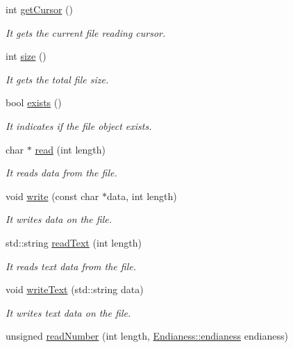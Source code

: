 \begin{DoxyCompactItemize}
int \hyperlink{class_file_a59701204411c5672fc35a95e31b002b3}{get\+Cursor} ()
\begin{DoxyCompactList}\small\item\em It gets the current file reading cursor. \end{DoxyCompactList}\item 
int \hyperlink{class_file_afcaf98328e440ccaedb20e310dc6b6c4}{size} ()
\begin{DoxyCompactList}\small\item\em It gets the total file size. \end{DoxyCompactList}\item 
bool \hyperlink{class_file_a4260fca380a387a8347b83bb4bee91b5}{exists} ()
\begin{DoxyCompactList}\small\item\em It indicates if the file object exists. \end{DoxyCompactList}\item 
char $\ast$ \hyperlink{class_file_a917f13960e83613e5cb36d433b4cd833}{read} (int length)
\begin{DoxyCompactList}\small\item\em It reads data from the file. \end{DoxyCompactList}\item 
void \hyperlink{class_file_a1259d180d1a2ff95bcccecff547dc839}{write} (const char $\ast$data, int length)
\begin{DoxyCompactList}\small\item\em It writes data on the file. \end{DoxyCompactList}\item 
std\+::string \hyperlink{class_file_a01b5902198fefc46fe835f42386ce047}{read\+Text} (int length)
\begin{DoxyCompactList}\small\item\em It reads text data from the file. \end{DoxyCompactList}\item 
void \hyperlink{class_file_a156d4a3d1e12e9ddf9c4948cae8c9734}{write\+Text} (std\+::string data)
\begin{DoxyCompactList}\small\item\em It writes text data on the file. \end{DoxyCompactList}\item 
unsigned \hyperlink{class_file_ab13f46c198a890f679351a2c9030e36d}{read\+Number} (int length, \hyperlink{struct_file_1_1_endianess_ac80818ac42fdd0c9aa29d424e65fa37e}{Endianess\+::endianess} endianess)

\end{DoxyCompactItemize}

